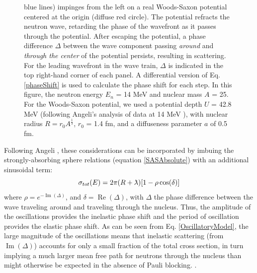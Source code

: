 \begin{figure}
\begin{minipage}{0.5\textwidth}
{            blue lines) impinges from the left on a real Woods-Saxon
            potential centered at the origin (diffuse red circle). The potential
            refracts the neutron wave,
            retarding the phase of the wavefront as it passes through the
            potential. After escaping the potential, a phase difference $\Delta$ between
            the wave component passing \textit{around} and \textit{through the center}
            of the potential persists, resulting in scattering.
            For the leading wavefront in the wave train, $\Delta$ is indicated in
            the top right-hand corner of each panel. A differential version of
            Eq. \ref{phaseShift} is used to
            calculate the phase shift for each step. In this figure, the neutron
            energy $E_{n}$ = 14 MeV and nuclear mass $A$ = 25. For the Woods-Saxon potential,
            we used a potential depth $U$ = 42.8 MeV (following Angeli's analysis
            of \tots data at 14 MeV \cite{Angeli1970}), with nuclear radius $R = 
            r_{0}A^{\frac{1}{3}}$, $r_{0}$ = 1.4 fm, and a diffuseness parameter
        $a$ of 0.5 fm.}
        \label{RamsauerPhaseShiftFigure}
    \end{minipage}
\end{figure}


Following Angeli \cite{Angeli1970}, these considerations can be incorporated by
imbuing the strongly-absorbing sphere relations (equation \ref{SASAbsolute}) with an additional sinusoidal term:
\begin{equation} \label{OscillatoryModel}
    \totE = 2\pi (R+\lambdabar)[1 - \rho \cos(\delta)]
\end{equation}
where $\rho = e^{-\operatorname{Im}(\Delta)}$, and $\delta =
\operatorname{Re}(\Delta)$, with $\Delta$ the phase difference between the wave traveling
around and traveling through the nucleus. Thus, the amplitude of the oscillations provides the 
inelastic phase shift and the period of oscillation provides the elastic phase shift.
As can be seen from Eq. 
\ref{OscillatoryModel}, the large magnitude of the oscillations means that inelastic
scattering (from $\operatorname{Im}(\Delta)$) accounts for only a small fraction of the total cross section, in turn implying a 
much larger mean free path for neutrons through the nucleus 
than might otherwise be expected in the absence of Pauli blocking.
\cite{Mohr1955}.

